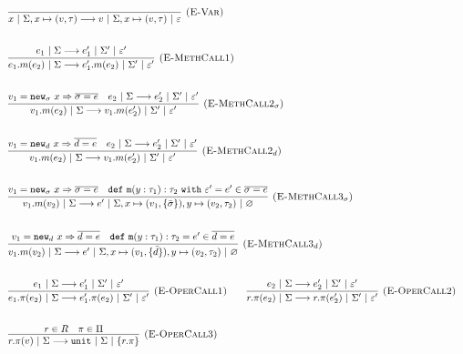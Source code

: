 \documentclass{llncs}
\newcommand{\keywadj}[1]{\mathtt{#1}}
\newcommand{\keyw}[1]{\keywadj{#1}~}
\begin{document}
\[
\begin{array}{lll}

	\infer[\textsc{(E-Var)}]
		{x~|~\Sigma, x \mapsto (v, \tau) \longrightarrow v~|~\Sigma, x \mapsto (v, \tau)~|~\varepsilon}
		{} \\[5ex]

	\infer[\textsc{(E-MethCall1)}]
		{e_1.m(e_2)~|~\Sigma \longrightarrow e_1'.m(e_2)~|~\Sigma'~|~\varepsilon'}
		{e_1~|~\Sigma \longrightarrow e_1'~|~\Sigma'~|~\varepsilon'}\\[5ex]

	\infer[\textsc{(E-MethCall2$_{\sigma}$)}]
		{v_1.m(e_2)~|~\Sigma \longrightarrow v_1.m(e_2')~|~\Sigma'~|~\varepsilon'}
		{v_1 = \keywadj{new}_{\sigma}~x \Rightarrow \overline{\sigma = e} & e_2~|~\Sigma \longrightarrow e_2'~|~\Sigma'~|~\varepsilon'} \\[5ex]
				
	\infer[\textsc{(E-MethCall2$_d$)}]
		{v_1.m(e_2)~|~\Sigma \longrightarrow v_1.m(e_2')~|~\Sigma'~|~\varepsilon'}
		{v_1 = \keywadj{new}_{d}~x \Rightarrow \overline{d = e} & e_2~|~\Sigma \longrightarrow e_2'~|~\Sigma'~|~\varepsilon'}
		\\[5ex]
		
	\infer[\textsc{(E-MethCall3$_{\sigma}$)}]
		{v_1.m(v_2)~|~\Sigma
			\longrightarrow
		 e'~|~\Sigma, x \mapsto (v_1, \{\bar \sigma\}), y \mapsto (v_2, \tau_2)~|~\varnothing}
  		{v_1 = \keywadj{new}_{\sigma}~x \Rightarrow \overline{\sigma = e} & \keywadj{def~m}(y: \tau_1) : \tau_2~\keyw{with} \varepsilon' = e' \in \overline {\sigma = e}} \\[5ex]

	\infer[\textsc{(E-MethCall3$_{d}$)}]
		{v_1.m(v_2)~|~\Sigma
			\longrightarrow
		 e'~|~\Sigma, x \mapsto (v_1, \{ \bar d \}), y \mapsto (v_2, \tau_2)~|~\varnothing}
  		{v_1 = \keywadj{new}_{d}~x \Rightarrow \overline{d = e} & \keywadj{def~m}(y: \tau_1) : \tau_2 = e' \in \overline {d = e}} \\[5ex]
			
	\infer[\textsc{(E-OperCall1)}]
		{e_1.\pi(e_2)~|~\Sigma
			\longrightarrow
		 e_1'.\pi(e_2)~|~\Sigma'~|~\varepsilon'}
		{e_1~|~\Sigma \longrightarrow e_1'~|~\Sigma'~|~\varepsilon'}
~~~~~~
			\infer[\textsc{(E-OperCall2)}]
		{r.\pi(e_2)~|~\Sigma
			\longrightarrow
		 r.\pi(e_2')~|~\Sigma'~|~\varepsilon'}
		{e_2~|~\Sigma \longrightarrow e_2'~|~\Sigma'~|~\varepsilon'} \\[5ex]
			
			\infer[\textsc{(E-OperCall3)}]
		{r.\pi(v)~|~\Sigma
			\longrightarrow
		 \keywadj{unit}~|~\Sigma~|~\{r.\pi\}}
		{r \in R & \pi \in \Pi}
\end{array}
\]
\end{document}
